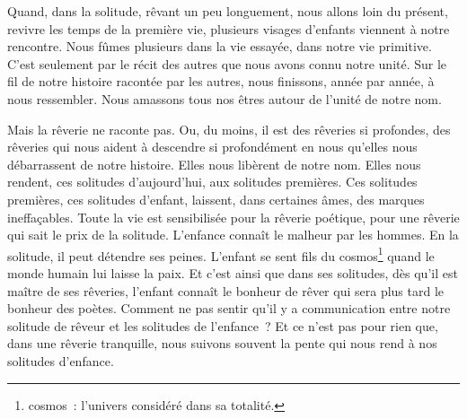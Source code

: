 	{Quand, dans la solitude, rêvant un peu longuement, nous allons loin du présent, revivre les temps de la première vie, plusieurs visages d'enfants viennent à notre rencontre. Nous fûmes plusieurs dans la vie essayée, dans notre vie primitive. C'est seulement par le récit des autres que nous avons connu notre unité. Sur le fil de notre histoire racontée par les autres, nous finissons, année par année, à nous ressembler. Nous amassons tous nos êtres autour de l'unité de notre nom.

Mais la rêverie ne raconte pas. Ou, du moins, il est des rêveries si profondes, des rêveries qui nous aident à descendre si profondément en nous qu'elles nous débarrassent de notre histoire. Elles nous libèrent de notre nom. Elles nous rendent, ces solitudes d'aujourd'hui, aux solitudes premières. Ces solitudes premières, ces solitudes d'enfant, laissent, dans certaines âmes, des marques ineffaçables. Toute la vie est sensibilisée pour la rêverie poétique, pour une rêverie qui sait le prix de la solitude. L'enfance connaît le malheur par les hommes. En la solitude, il peut détendre ses peines. L'enfant se sent fils du cosmos\footnote{cosmos~: l'univers considéré dans sa totalité.} quand le monde humain lui laisse la paix. Et c'est ainsi que dans ses solitudes, dès qu'il est maître de ses rêveries, l'enfant connaît le bonheur de rêver qui sera plus tard le bonheur des poètes. Comment ne pas sentir qu'il y a communication entre notre solitude de rêveur et les solitudes de l'enfance~? Et ce n'est pas pour rien que, dans une rêverie tranquille, nous suivons souvent la pente qui nous rend à nos solitudes d'enfance.
}


